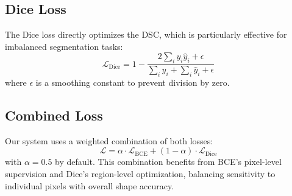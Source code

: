 \subsection{Dice Loss}
\label{sec:bg:dice}

The Dice loss directly optimizes the \ac{DSC}, which is particularly effective for imbalanced segmentation tasks:
\begin{equation}
	\mathcal{L}_{\text{Dice}} = 1 - \frac{2 \sum_{i} y_i \hat{y}_i + \epsilon}{\sum_{i} y_i + \sum_{i} \hat{y}_i + \epsilon}
\end{equation}
where $\epsilon$ is a smoothing constant to prevent division by zero.

\subsection{Combined Loss}
\label{sec:bg:combined}

Our system uses a weighted combination of both losses:
\begin{equation}
	\mathcal{L} = \alpha \cdot \mathcal{L}_{\text{BCE}} + (1 - \alpha) \cdot \mathcal{L}_{\text{Dice}}
	\label{eq:combined_loss}
\end{equation}
with $\alpha = 0.5$ by default. This combination benefits from BCE's pixel-level supervision and Dice's region-level optimization, balancing sensitivity to individual pixels with overall shape accuracy.
